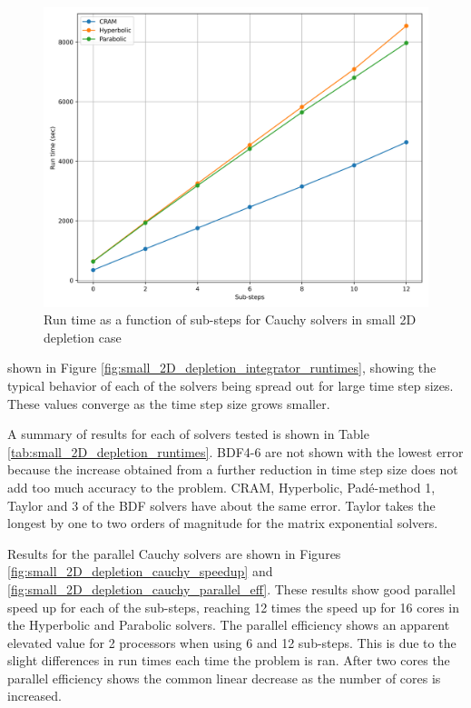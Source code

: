 \clearpage

\begin{figure}[p]
    \centering
    \includegraphics[width=5in]{images/chapter-5/caseStudies/small2DDepletion/msr2DDepletionSmallCauchyRuntimes.png}
    \caption{Run time as a function of sub-steps for Cauchy solvers in small 2D depletion case}
    \label{fig:small_2D_depletion_Cauchy_runtimes}
\end{figure}

\clearpage

\noindent shown in Figure \ref{fig:small_2D_depletion_integrator_runtimes}, showing the typical behavior of each of the solvers being spread out for large time step sizes. These values converge as the time step size grows smaller. 

A summary of results for each of solvers tested is shown in Table \ref{tab:small_2D_depletion_runtimes}. BDF4-6 are not shown with the lowest error because the increase obtained from a further reduction in time step size does not add too much accuracy to the problem. CRAM, Hyperbolic, Pad\'e-method 1, Taylor and 3 of the BDF solvers have about the same error. Taylor takes the longest by one to two orders of magnitude for the matrix exponential solvers. 

Results for the parallel Cauchy solvers are shown in Figures \ref{fig:small_2D_depletion_cauchy_speedup} and \ref{fig:small_2D_depletion_cauchy_parallel_eff}. These results show good parallel speed up for each of the sub-steps, reaching 12 times the speed up for 16 cores in the Hyperbolic and Parabolic solvers. The parallel efficiency shows an apparent elevated value for 2 processors when using 6 and 12 sub-steps. This is due to the slight differences in run times each time the problem is ran. After two cores the parallel efficiency shows the common linear decrease as the number of cores is increased. 


